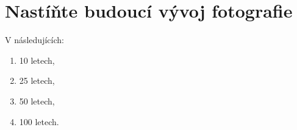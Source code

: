\section{Nastíňte budoucí vývoj fotografie}
V následujících:
\begin{enumerate}
    \item 10 letech,
    \item 25 letech,
    \item 50 letech,
    \item 100 letech.
\end{enumerate}